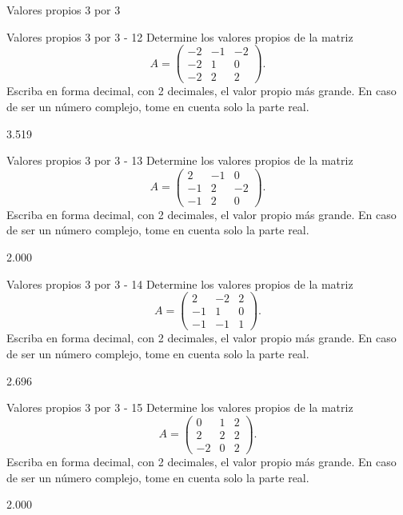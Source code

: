 \documentclass[a4,11pt]{aleph-notas}
\begin{document}
\begin{quiz}{Valores propios 3 por 3}
\begin{numerical}[tolerance=0.01]%
    {Valores propios 3 por 3 - 12}
    Determine los valores propios de la matriz
    \[
    A = \begin{pmatrix}
    -2 & -1 & -2 \\
    -2 & 1 & 0 \\
    -2 & 2 & 2
    \end{pmatrix}.
    \]
    Escriba en forma decimal, con 2 decimales, el valor propio más grande. En caso de ser un número complejo, tome en cuenta solo la parte real.
    \item[] 3.519
\end{numerical}

\begin{numerical}[tolerance=0.01]%
    {Valores propios 3 por 3 - 13}
    Determine los valores propios de la matriz
    \[
    A = \begin{pmatrix}
    2 & -1 & 0 \\
    -1 & 2 & -2 \\
    -1 & 2 & 0
    \end{pmatrix}.
    \]
    Escriba en forma decimal, con 2 decimales, el valor propio más grande. En caso de ser un número complejo, tome en cuenta solo la parte real.
    \item[] 2.000
\end{numerical}

\begin{numerical}[tolerance=0.01]%
    {Valores propios 3 por 3 - 14}
    Determine los valores propios de la matriz
    \[
    A = \begin{pmatrix}
    2 & -2 & 2 \\
    -1 & 1 & 0 \\
    -1 & -1 & 1
    \end{pmatrix}.
    \]
    Escriba en forma decimal, con 2 decimales, el valor propio más grande. En caso de ser un número complejo, tome en cuenta solo la parte real.
    \item[] 2.696
\end{numerical}

\begin{numerical}[tolerance=0.01]%
    {Valores propios 3 por 3 - 15}
    Determine los valores propios de la matriz
    \[
    A = \begin{pmatrix}
    0 & 1 & 2 \\
    2 & 2 & 2 \\
    -2 & 0 & 2
    \end{pmatrix}.
    \]
    Escriba en forma decimal, con 2 decimales, el valor propio más grande. En caso de ser un número complejo, tome en cuenta solo la parte real.
    \item[] 2.000
\end{numerical}


\end{quiz}
\end{document}
